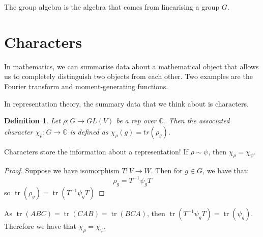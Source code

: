 \documentclass[]{report}
\newtheorem{definition}[theorem]{Definition}
\theoremstyle{definition}
\numberwithin{theorem}{section}
\numberwithin{equation}{section}
\newcommand{\tr}{\operatorname{tr}}
\begin{document}
The group algebra is the algebra that comes from linearising a group $G$. 

\section{Characters}
In mathematics, we can summarise data about a mathematical object that allows us to completely distinguish two objects from each other. Two examples are the Fourier transform and moment-generating functions. 

In representation theory, the summary data that we think about is characters.

\begin{definition}
	Let $\rho : G \rightarrow GL(V)$ be a rep over $\mathbb{C}$. Then the associated character $\chi_\rho : G \rightarrow \mathbb{C}$ is defined as $\chi_\rho(g) = tr(\rho_g)$. 
\end{definition}
Characters store the information about a representation!
If $\rho \sim \psi$, then $\chi_\rho = \chi_\psi$. 
\begin{proof}
	Suppose we have isomorphism $T: V \rightarrow W$. Then for $g \in G$, we have that:
	\begin{equation}
		\rho_g = T^{-1} \psi_g T
	\end{equation}
	so $\tr(\rho_g) = \tr(T^{-1} \psi_g T)$
\end{proof}
As $\tr(A B C) = \tr(C A B) = \tr(B C A)$, then $\tr(T^{-1} \psi_g T) = \tr(\psi_g)$. Therefore we have that $\chi_\rho = \chi_\psi$. 
\end{document}
